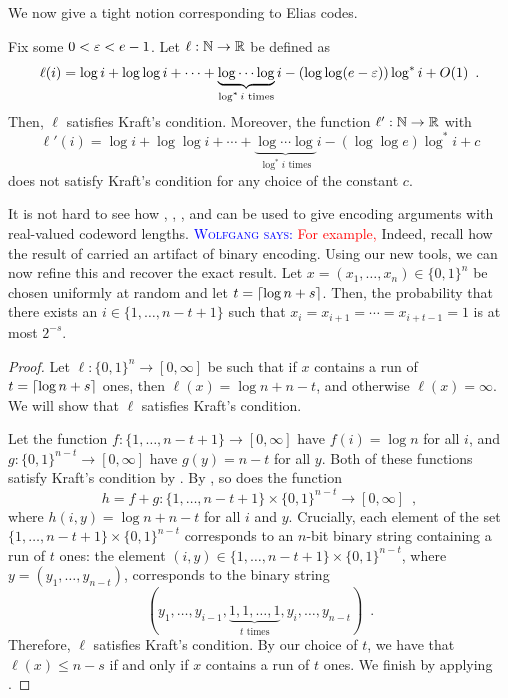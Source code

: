 \documentclass{patmorin}
\newenvironment{customthm}[1]
  {\renewcommand\theinnercustomthm{#1}\innercustomthm}
  {\endinnercustomthm}
\newcommand{\aremark}[3]{\textcolor{blue}{\textsc{#1 #2:}}
  \textcolor{red}{\textsf{#3}}}
\newcommand{\wolfgang}[2][says]{\aremark{Wolfgang}{#1}{#2}}
\begin{document}
We now give a tight notion corresponding to Elias codes.
\begin{thm}
  Fix some $0 < \varepsilon < e - 1$. Let $\ell : \mathbb{N} \to \mathbb{R}$ be defined as
  \[
  \ell(i) = \log i + \log \log i + \cdots + \underbrace{\log \cdots
    \log}_{\text{$\log^* i$ times}} i - (\log \log (e - \varepsilon)) \log^*
  i + O(1) \enspace .
  \]
  Then, $\ell$ satisfies Kraft's condition. Moreover, the function
  $\ell' : \mathbb{N} \to \mathbb{R}$ with
  \[
  \ell'(i) = \log i + \log \log i + \cdots + \underbrace{\log \cdots
    \log}_{\text{$\log^* i$ times}} i - (\log \log e) \log^* i + c
  \]
  does not satisfy Kraft's condition for any choice of the constant
  $c$.
\end{thm}

It is not hard to see how , ,
, and  can be used to
give encoding arguments with real-valued codeword lengths. 
\wolfgang{For example,}
Indeed,
recall how the result of  carried an artifact of binary
encoding. Using our new tools, we can now refine this and recover the
exact result.
\begin{customthm}{\ref*{thm:runs-i}b}
  Let $x=(x_1,\ldots,x_n)\in\{0,1\}^n$ be chosen uniformly at random
  and let $t = {\lceil \log n + s \rceil}$. Then, the probability that there
  exists an $i\in\{1,\ldots,n-t+1\}$ such that
  $x_i=x_{i+1}=\cdots=x_{i+t-1}=1$ is at most $2^{-s}$.
\end{customthm}
\begin{proof}
  Let $\ell : \{0, 1\}^n \to [0, \infty]$ be such that if $x$ contains
  a run of $t = {\lceil \log n + s \rceil}$ ones, then
  $\ell(x) = \log n + n - t$, and otherwise $\ell(x) = \infty$. We
  will show that $\ell$ satisfies Kraft's condition.


  Let the function $f : \{1, \ldots, n - t + 1\} \to [0, \infty]$ have
  $f(i) = \log n$ for all $i$, and
  $g : \{0, 1\}^{n - t} \to [0, \infty]$ have $g(y) = n - t$ for all
  $y$. Both of these functions satisfy Kraft's condition by
  . By , so does
  the function
  \[
    h = f + g : \{1, \ldots, n - t + 1\} \times \{0, 1\}^{n - t} \to
    [0, \infty] \enspace ,
  \]
  where $h(i, y) = \log n + n - t$ for all $i$ and $y$. Crucially,
  each element of the set $\{1, \ldots, n - t + 1\} \times \{0, 1\}^{n
    - t}$ corresponds to an $n$-bit binary string containing a run of
  $t$ ones: the element $(i, y) \in \{1, \ldots, n - t + 1\} \times
  \{0, 1\}^{n - t}$, where $y = (y_1, \ldots, y_{n - t})$, corresponds
  to the binary string
  \[
  (y_1, \dots, y_{i - 1}, \underbrace{1, 1, \dots, 1}_{\text{$t$ times}},
  y_i, \dots, y_{n - t}) \enspace .
  \]
  Therefore, $\ell$ satisfies Kraft's condition. By our choice of
  $t$, we have that $\ell(x) \leq n - s$ if and only if $x$ contains a
  run of $t$ ones. We finish by applying .
\end{proof}
\end{document}

